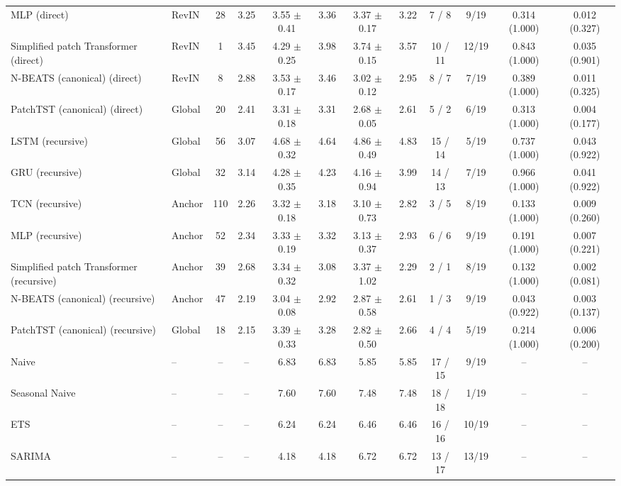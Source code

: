 \begin{table}[htbp]
\begin{adjustbox}{max width=\textwidth}
\begin{tabular}{llcccccccccc}
MLP (direct) & RevIN & 28 & 3.25 & 3.55 $\pm$ 0.41 & 3.36 & 3.37 $\pm$ 0.17 & 3.22 & 7 / 8 & 9/19 & 0.314 (1.000) & 0.012 (0.327) \\
Simplified patch Transformer (direct) & RevIN & 1 & 3.45 & 4.29 $\pm$ 0.25 & 3.98 & 3.74 $\pm$ 0.15 & 3.57 & 10 / 11 & 12/19 & 0.843 (1.000) & 0.035 (0.901) \\
N-BEATS (canonical) (direct) & RevIN & 8 & 2.88 & 3.53 $\pm$ 0.17 & 3.46 & 3.02 $\pm$ 0.12 & 2.95 & 8 / 7 & 7/19 & 0.389 (1.000) & 0.011 (0.325) \\
PatchTST (canonical) (direct) & Global & 20 & 2.41 & 3.31 $\pm$ 0.18 & 3.31 & 2.68 $\pm$ 0.05 & 2.61 & 5 / 2 & 6/19 & 0.313 (1.000) & 0.004 (0.177) \\
\addlinespace
LSTM (recursive) & Global & 56 & 3.07 & 4.68 $\pm$ 0.32 & 4.64 & 4.86 $\pm$ 0.49 & 4.83 & 15 / 14 & 5/19 & 0.737 (1.000) & 0.043 (0.922) \\
GRU (recursive) & Global & 32 & 3.14 & 4.28 $\pm$ 0.35 & 4.23 & 4.16 $\pm$ 0.94 & 3.99 & 14 / 13 & 7/19 & 0.966 (1.000) & 0.041 (0.922) \\
TCN (recursive) & Anchor & 110 & 2.26 & 3.32 $\pm$ 0.18 & 3.18 & 3.10 $\pm$ 0.73 & 2.82 & 3 / 5 & 8/19 & 0.133 (1.000) & 0.009 (0.260) \\
MLP (recursive) & Anchor & 52 & 2.34 & 3.33 $\pm$ 0.19 & 3.32 & 3.13 $\pm$ 0.37 & 2.93 & 6 / 6 & 9/19 & 0.191 (1.000) & 0.007 (0.221) \\
Simplified patch Transformer (recursive) & Anchor & 39 & 2.68 & 3.34 $\pm$ 0.32 & 3.08 & 3.37 $\pm$ 1.02 & 2.29 & 2 / 1 & 8/19 & 0.132 (1.000) & 0.002 (0.081) \\
N-BEATS (canonical) (recursive) & Anchor & 47 & 2.19 & 3.04 $\pm$ 0.08 & 2.92 & 2.87 $\pm$ 0.58 & 2.61 & 1 / 3 & 9/19 & 0.043 (0.922) & 0.003 (0.137) \\
PatchTST (canonical) (recursive) & Global & 18 & 2.15 & 3.39 $\pm$ 0.33 & 3.28 & 2.82 $\pm$ 0.50 & 2.66 & 4 / 4 & 5/19 & 0.214 (1.000) & 0.006 (0.200) \\
\addlinespace
Naive & -- & -- & -- & 6.83 & 6.83 & 5.85 & 5.85 & 17 / 15 & 9/19 & -- & -- \\
Seasonal Naive & -- & -- & -- & 7.60 & 7.60 & 7.48 & 7.48 & 18 / 18 & 1/19 & -- & -- \\
ETS & -- & -- & -- & 6.24 & 6.24 & 6.46 & 6.46 & 16 / 16 & 10/19 & -- & -- \\
SARIMA & -- & -- & -- & 4.18 & 4.18 & 6.72 & 6.72 & 13 / 17 & 13/19 & -- & -- \\
\bottomrule
\end{tabular}
\end{adjustbox}
\end{table}
